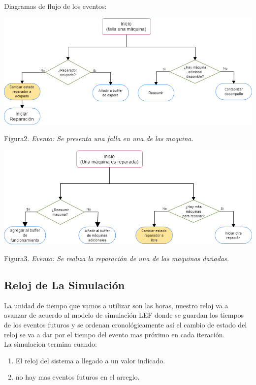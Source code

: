 \documentclass[10pt]{article}
\begin{document}
Diagramas de flujo de los eventos:
\begin{center}

\includegraphics[scale=0.47]{fallaMaquina.png}

Figura2. \emph{Evento: Se presenta una falla en una de las maquina.}
\end{center}
\begin{center}

\includegraphics[scale=0.47]{reparar.png}

Figura3. \emph{Evento: Se realiza la reparación de una de las maquinas dañadas.}
\end{center}



\subsection{Reloj de La Simulación}

La unidad de tiempo que vamos a utilizar son las horas, nuestro reloj va a avanzar de acuerdo al modelo de simulación LEF donde se guardan los tiempos de los eventos futuros y se ordenan cronológicamente así el cambio de estado del reloj  se va a dar por el tiempo del evento mas próximo en cada iteración.\\

La simulacion termina cuando:
\begin{enumerate}
\item El reloj del sistema a llegado a un valor indicado.
\item no hay mas eventos futuros en el arreglo.
\end{enumerate}
\end{document}

